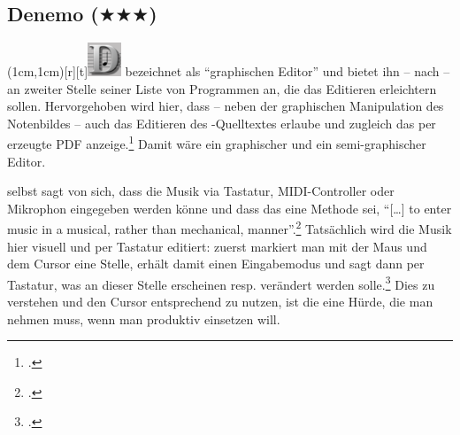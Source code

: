 %
%
%



\subsection{Denemo ($\bigstar\bigstar\bigstar$)}

\parpic(1cm,1cm)[r][t]{\includegraphics[width=1cm]{logos/denemo-300dpi.png}}
\label{Denemo} bezeichnet  als \enquote{graphischen
Editor} und bietet ihn -- nach  -- an zweiter Stelle seiner
Liste von Programmen an, die das Editieren erleichtern sollen. Hervorgehoben
wird hier, dass  -- neben der graphischen Manipulation des
Notenbildes -- auch das Editieren des -Quelltextes erlaube und
zugleich das per  erzeugte PDF anzeige.\footcite[vgl.][\nopage
wp]{LilyPond2018g} Damit wäre  ein graphischer und ein
semi-graphischer Editor.

 selbst sagt von sich, dass die Musik via Tastatur, MIDI-Controller
oder Mikrophon eingegeben werden könne und dass das eine Methode sei,
\enquote{[\ldots] to enter music in a musical, rather than mechanical,
manner}.\footcite[vgl.][\nopage wp]{Denemo2019b} Tatsächlich wird die Musik hier
visuell und per Tastatur editiert: zuerst markiert man mit der Maus und dem
Cursor eine Stelle, erhält damit einen Eingabemodus und sagt dann per Tastatur,
was an dieser Stelle erscheinen resp. verändert werden solle.\footcite[vgl.][1,
5, u. 47ff]{Shann2015b} Dies zu verstehen und den Cursor entsprechend zu nutzen,
ist die eine Hürde, die man nehmen muss, wenn man  produktiv
einsetzen will.

